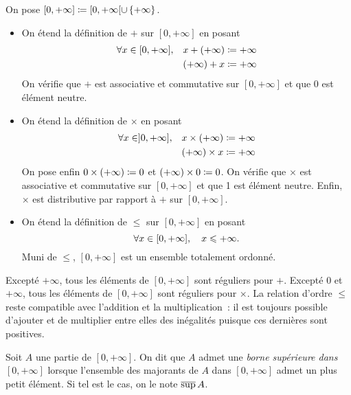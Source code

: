 \documentclass{magnolia}
\begin{document}
\begin{definition}
On pose $[0,+\infty]\coloneqq [0,+\infty[\cup\left\{+\infty\right\}$.
\begin{itemize}
\item On étend la définition de $+$ sur $[0,+\infty]$ en posant
  \begin{eqnarray*}
  \forall x\in[0,+\infty],& &x + (+\infty) \coloneqq +\infty\\ 
                          & &(+\infty) + x \coloneqq +\infty
  \end{eqnarray*}
  On vérifie que $+$ est associative et commutative sur $[0,+\infty]$ et que 0 est élément
  neutre. 
\item On étend la définition de $\times$ en posant
  \begin{eqnarray*}
  \forall x\in]0,+\infty],& &x \times (+\infty) \coloneqq +\infty\\ 
                          & &(+\infty) \times x \coloneqq +\infty
  \end{eqnarray*}
  On pose enfin $0\times(+\infty)\coloneqq 0$ et $(+\infty)\times 0\coloneqq 0$. On vérifie que $\times$
  est associative et commutative sur $[0,+\infty]$ et que 1 est élément neutre. Enfin,
  $\times$ est distributive par rapport à $+$ sur $[0,+\infty]$.
\item On étend la définition de $\leq$ sur $[0,+\infty]$ en posant
  \[\forall x\in[0,+\infty],\quad x\leqslant +\infty.\]
  Muni de $\leq$, $[0,+\infty]$ est un ensemble totalement ordonné.
\end{itemize}
\end{definition}

\begin{remarques}
\remarque Excepté $+\infty$, tous les éléments de $[0,+\infty]$ sont réguliers pour $+$.
  Excepté 0 et $+\infty$, tous les éléments de $[0,+\infty]$ sont réguliers pour $\times$.
\remarque La relation d'ordre $\leq$ reste compatible avec l'addition et la multiplication~:
  il est toujours possible d'ajouter et de multiplier entre elles des inégalités puisque
  ces dernières sont positives.
\end{remarques}

\begin{definition}
Soit $A$ une partie de $[0,+\infty]$. On dit que $A$ admet une \emph{borne supérieure dans
$[0,+\infty]$} lorsque l'ensemble des majorants de $A$ dans $[0,+\infty]$ admet un plus
petit élément. Si tel est le cas, on le note $\overline{\sup}\, A$.
\end{definition}
\end{document}
